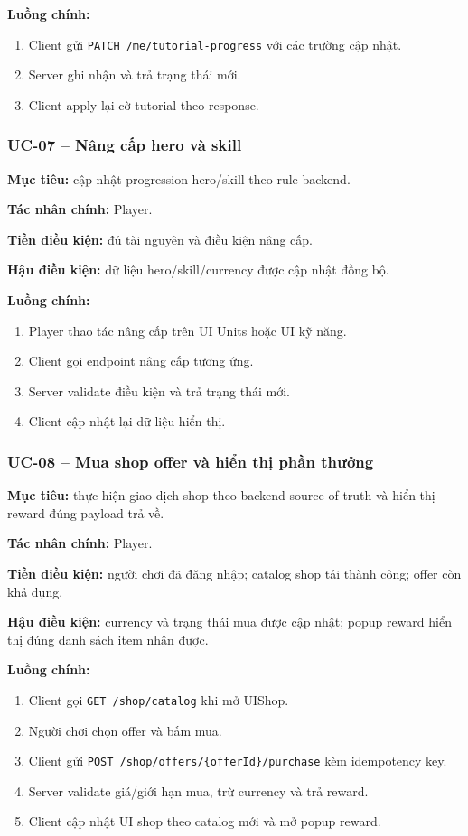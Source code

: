\textbf{Luồng chính:}
\begin{enumerate}
    \item Client gửi \texttt{PATCH /me/\allowbreak tutorial-progress} với các trường cập nhật.
    \item Server ghi nhận và trả trạng thái mới.
    \item Client apply lại cờ tutorial theo response.
\end{enumerate}

\subsubsection{UC-07 -- Nâng cấp hero và skill}
\label{subsubsec:uc-07}

\textbf{Mục tiêu:} cập nhật progression hero/\allowbreak skill theo rule backend.

\textbf{Tác nhân chính:} Player.

\textbf{Tiền điều kiện:} đủ tài nguyên và điều kiện nâng cấp.

\textbf{Hậu điều kiện:} dữ liệu hero/\allowbreak skill/\allowbreak currency được cập nhật đồng bộ.

\textbf{Luồng chính:}
\begin{enumerate}
    \item Player thao tác nâng cấp trên UI Units hoặc UI kỹ năng.
    \item Client gọi endpoint nâng cấp tương ứng.
    \item Server validate điều kiện và trả trạng thái mới.
    \item Client cập nhật lại dữ liệu hiển thị.
\end{enumerate}

\subsubsection{UC-08 -- Mua shop offer và hiển thị phần thưởng}
\label{subsubsec:uc-08}

\textbf{Mục tiêu:} thực hiện giao dịch shop theo backend source-of-truth và hiển thị reward đúng payload trả về.

\textbf{Tác nhân chính:} Player.

\textbf{Tiền điều kiện:} người chơi đã đăng nhập; catalog shop tải thành công; offer còn khả dụng.

\textbf{Hậu điều kiện:} currency và trạng thái mua được cập nhật; popup reward hiển thị đúng danh sách item nhận được.

\textbf{Luồng chính:}
\begin{enumerate}
    \item Client gọi \texttt{GET /shop/catalog} khi mở UIShop.
    \item Người chơi chọn offer và bấm mua.
    \item Client gửi \texttt{POST /shop/\allowbreak offers/\allowbreak \{offerId\}/\allowbreak purchase} kèm idempotency key.
    \item Server validate giá/giới hạn mua, trừ currency và trả reward.
    \item Client cập nhật UI shop theo catalog mới và mở popup reward.
\end{enumerate}

